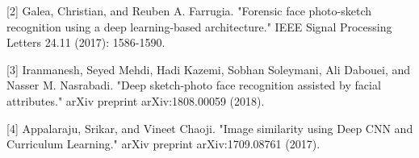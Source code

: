 \documentclass[journal]{IEEEtran} %
\begin{document}
[2] Galea, Christian, and Reuben A. Farrugia. "Forensic face photo-sketch recognition using a deep learning-based architecture." IEEE Signal Processing Letters 24.11 (2017): 1586-1590. 

[3] Iranmanesh, Seyed Mehdi, Hadi Kazemi, Sobhan Soleymani, Ali Dabouei, and Nasser M. Nasrabadi. "Deep sketch-photo face recognition assisted by facial attributes." arXiv preprint arXiv:1808.00059 (2018). 

[4] Appalaraju, Srikar, and Vineet Chaoji. "Image similarity using Deep CNN and Curriculum Learning." arXiv preprint arXiv:1709.08761 (2017). 
\end{document}

